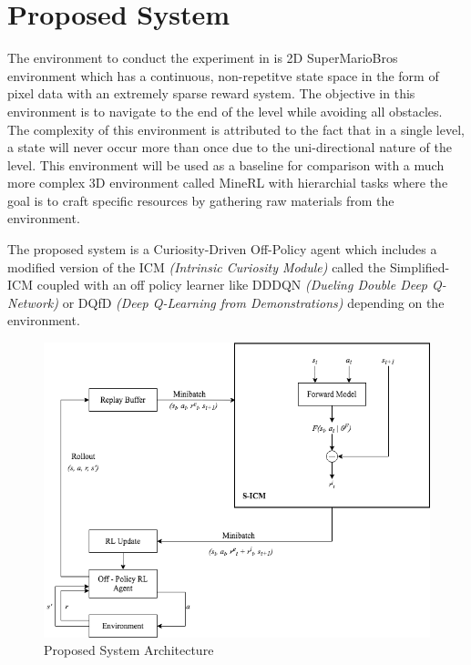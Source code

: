 \documentclass[12pt,a4paper]{article}
\begin{document}
\section{Proposed System}
The environment to conduct the experiment in is 2D SuperMarioBros environment which 
has a continuous, non-repetitve state space in the form of pixel data with an 
extremely sparse reward system. The objective in this environment is to navigate to the 
end of the level while avoiding all obstacles. The complexity of this environment is attributed
to the fact that in a single level, a state will never occur more than once due to the
uni-directional nature of the level. This environment will be used as a baseline for comparison
with a much more complex 3D environment called MineRL with hierarchial tasks where the 
goal is to craft specific resources by gathering raw materials from the environment.

The proposed system is a Curiosity-Driven Off-Policy agent which includes a modified version
of the ICM \textit{(Intrinsic Curiosity Module)} called the Simplified-ICM \cite{cdl2} coupled with an 
off policy learner like DDDQN \textit{(Dueling Double Deep Q-Network)} or DQfD
\textit{(Deep Q-Learning from Demonstrations)} depending on the environment.

\begin{figure}[H]
  \centering
  \includegraphics[scale=0.65]{review-0-architecture.png}
  \caption{Proposed System Architecture}
  \label{fig:proposed-system}
\end{figure}
\end{document}
